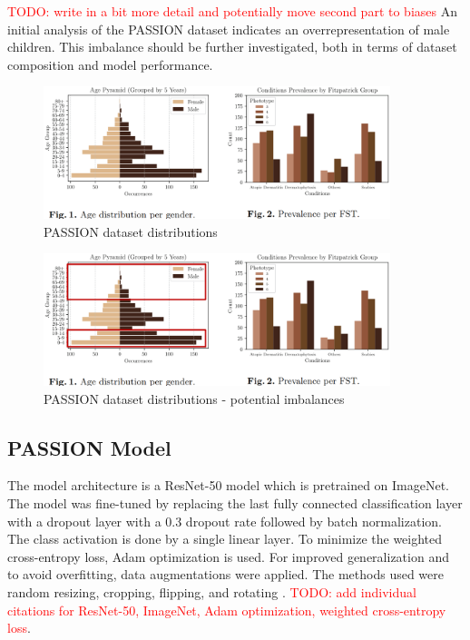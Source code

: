 \documentclass[12pt, a4paper, oneside]{book}   	%
\renewcommand{\todo}[1]{\textcolor{red}{TODO: #1}}
\begin{document}
				\todo{write in a bit more detail and potentially move second part to biases}
				An initial analysis of the PASSION dataset indicates an overrepresentation of male children. This imbalance should be further investigated, both in terms of dataset composition and model performance.
				
				\begin{figure}[H]
					\centering
					\includegraphics[width=0.9\textwidth]{figures/PASSIONDatasetDistribution.png}
					\caption{PASSION dataset distributions \autocite{Gottfrois2024}}
					\label{fig:PASSIONDistr}
				\end{figure}
				
				\begin{figure}[H]
					\centering
					\includegraphics[width=0.9\textwidth]{figures/PASSIONDatasetDistributionPotentialImbalances.png}
					\caption{PASSION dataset distributions - potential imbalances}
					\label{fig:PASSIONDistrImbalances}
				\end{figure}

				
				
			\subsection{PASSION Model}
			  The model architecture is a ResNet-50 model which is pretrained on ImageNet. The model was fine-tuned by replacing the last fully connected classification layer with a dropout layer with a 0.3 dropout rate followed by batch normalization. The class activation is done by a single linear layer. To minimize the weighted cross-entropy loss, Adam optimization is used. For improved generalization and to avoid overfitting, data augmentations were applied. The methods used were random resizing, cropping, flipping, and rotating \textcite{Gottfrois2024}. \todo{add individual citations for ResNet-50, ImageNet, Adam optimization, weighted cross-entropy loss}.
			  
\end{document}
